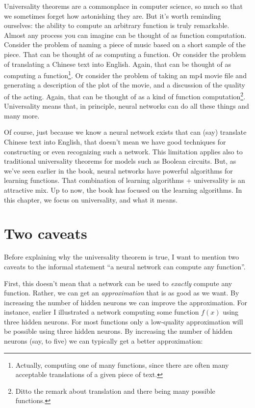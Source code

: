 Universality theorems are a commonplace in computer science, so much so that we sometimes forget how astonishing they are. But it's worth reminding ourselves: the ability to compute an arbitrary function is truly remarkable. Almost any process you can imagine can be thought of as function computation. Consider the problem of naming a piece of music based on a short sample of the piece. That can be thought of as computing a function. Or consider the problem of translating a Chinese text into English. Again, that can be thought of as computing a function\footnote{Actually, computing one of many functions, since there are often many acceptable translations of a given piece of text.}. Or consider the problem of taking an mp4 movie file and generating a description of the plot of the movie, and a discussion of the quality of the acting. Again, that can be thought of as a kind of function computation\footnote{Ditto the remark about translation and there being many possible functions.}. Universality means that, in principle, neural networks can do all these things and many more.


Of course, just because we know a neural network exists that can (say) translate Chinese text into English, that doesn't mean we have good techniques for constructing or even recognizing such a network. This limitation applies also to traditional universality theorems for models such as Boolean circuits. But, as we've seen earlier in the book, neural networks have powerful algorithms for learning functions. That combination of learning algorithms + universality is an attractive mix. Up to now, the book has focused on the learning algorithms. In this chapter, we focus on universality, and what it means.

\section{Two caveats}

Before explaining why the universality theorem is true, I want to mention two caveats to the informal statement ``a neural network can compute any function''.

First, this doesn't mean that a network can be used to \textit{exactly} compute any function. Rather, we can get an \textit{approximation} that is as good as we want. By increasing the number of hidden neurons we can improve the approximation. For instance, earlier I illustrated a network computing some function $f(x)$
using three hidden neurons. For most functions only a low-quality approximation will be possible using three hidden neurons. By increasing the number of hidden neurons (say, to five) we can typically get a better approximation:

